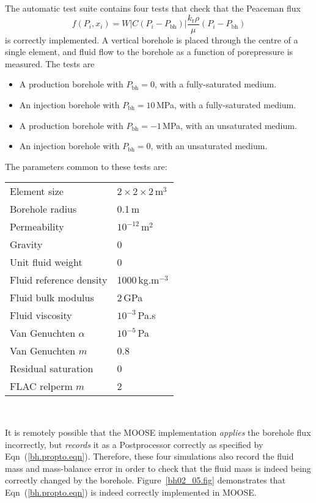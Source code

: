 \documentclass[]{scrreprt}
\begin{document}
The automatic test suite contains four tests that check that the Peaceman flux
\begin{equation}
f(P_{i}, x_{i}) =
W \left|C(P_{i}-P_{\mathrm{bh}})\right|
\frac{k_{\mathrm{r}}\rho}{\mu}(P_{i} - P_{\mathrm{bh}})
\label{bh.propto.eqn}
\end{equation}
is correctly implemented.  A vertical borehole is placed through the
centre of a single element, and fluid flow to the borehole as a
function of porepressure is measured.  The tests are
\begin{itemize}
\item A production borehole with $P_{\mathrm{bh}} = 0$, with a
  fully-saturated medium.
\item An injection borehole with $P_{\mathrm{bh}} = 10$\,MPa, with a
  fully-saturated medium.
\item A production borehole with $P_{\mathrm{bh}} = -1$\,MPa, with an
  unsaturated medium.
\item An injection borehole with $P_{\mathrm{bh}} = 0$, with an
  unsaturated medium.
\end{itemize}
The parameters common to these tests are:
\begin{center}
\begin{tabular}{|ll|}
\hline
Element size & $2\times 2\times 2$\,m$^{3}$ \\
Borehole radius & 0.1\,m \\
Permeability & $10^{-12}$\,m$^{2}$ \\
Gravity & 0 \\
Unit fluid weight & 0 \\
Fluid reference density & 1000\,kg.m$^{-3}$ \\
Fluid bulk modulus & 2\,GPa \\
Fluid viscosity & $10^{-3}$\,Pa.s \\
Van Genuchten $\alpha$ & $10^{-5}$\,Pa \\
Van Genuchten $m$ & 0.8  \\
Residual saturation & 0 \\
FLAC relperm $m$ & 2 \\
\hline
\end{tabular} \\
\end{center}
It is remotely possible that the MOOSE implementation {\em applies}
the borehole flux incorrectly, but {\em records} it as a Postprocessor
correctly as specified by Eqn~(\ref{bh.propto.eqn}).  Therefore, these
four simulations also record the fluid mass and mass-balance error in
order to check that the fluid mass is indeed being correctly changed
by the borehole.  Figure~\ref{bh02_05.fig} demonstrates that
Eqn~(\ref{bh.propto.eqn}) is indeed correctly implemented in MOOSE.
\end{document}

